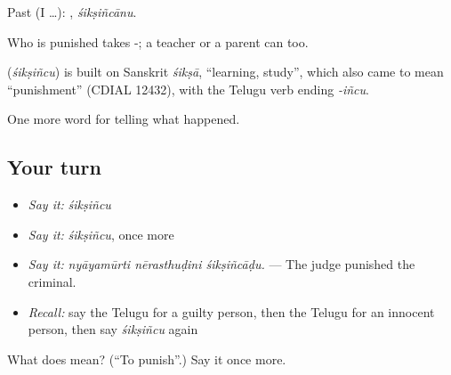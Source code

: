 Past (I …): , \emph{śikṣiñcānu}.

Who is punished takes -; a teacher or a parent can  too.

\begin{cousinweb}
\textbf{} (\emph{śikṣiñcu}) is built on Sanskrit \emph{śikṣā}, \textquotedblleft{}learning, study\textquotedblright{}, which also came to mean \textquotedblleft{}punishment\textquotedblright{} (CDIAL 12432), with the Telugu verb ending \emph{-iñcu}.
\end{cousinweb}

\begin{grammarlens}[title={What you've built}]
One more word for telling what happened.
\end{grammarlens}

\subsection*{Your turn}
\begin{itemize}
\raggedright
  \item \emph{Say it:} \emph{śikṣiñcu}
  \item \emph{Say it:} \emph{śikṣiñcu}, once more
  \item \emph{Say it:} \emph{nyāyamūrti nērasthuḍini śikṣiñcāḍu.} — The judge punished the criminal.
  \item \emph{Recall:} say the Telugu for a guilty person, then the Telugu for an innocent person, then say \emph{śikṣiñcu} again
\end{itemize}

\begin{tcolorbox}[breakable,colback=teal!4,colframe=teal!35!black,title={Before you move on}]
What does  mean? (\textquotedblleft{}To punish\textquotedblright{}.) Say it once more.
\end{tcolorbox}
